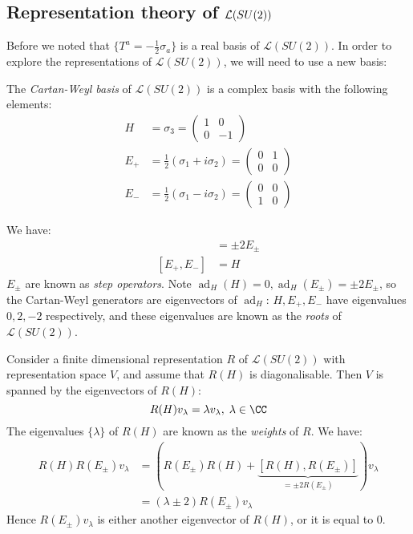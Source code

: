 \documentclass{jknotes}
\begin{document}
\subsection{Representation theory of \texorpdfstring{${\cal L}(SU(2))$}{L(SU(2))}}
Before we noted that \(\{T^a = -\frac{1}{2}\sigma_a\}\) is a real basis of \(\mathcal{L}(SU(2))\). In order to explore the representations of \(\mathcal{L}(SU(2))\), we will need to use a new basis:
\begin{defn}
    The \emph{Cartan-Weyl basis} of \(\mathcal{L}(SU(2))\) is a complex basis with the following elements:
    \begin{align}
        H &= \sigma_3 =
        \begin{pmatrix}
            1 & 0 \\
            0 & -1
        \end{pmatrix} \\
        E_+ &= \frac{1}{2}(\sigma_1 + i\sigma_2) = 
        \begin{pmatrix}
            0 & 1 \\
            0 & 0
        \end{pmatrix} \\
        E_- &= \frac{1}{2}(\sigma_1 - i\sigma_2) = 
        \begin{pmatrix}
            0 & 0 \\
            1 & 0
        \end{pmatrix}
    \end{align}
\end{defn}
We have:
\begin{align}
    [H,E_\pm] &= \pm2E_\pm \\
    [E_+,E_-] &= H
\end{align}
\(E_\pm\) are known as \emph{step operators}. Note \(\operatorname{ad}_H(H) = 0, \operatorname{ad}_H(E_\pm) = \pm2E_\pm\), so the Cartan-Weyl generators are eigenvectors of \(\operatorname{ad}_H\): \(H,E_+,E_-\) have eigenvalues \(0,2,-2\) respectively, and these eigenvalues are known as the \emph{roots} of \(\mathcal{L}(SU(2))\).

Consider a finite dimensional representation \(R\) of \(\mathcal{L}(SU(2))\) with representation space \(V\), and assume that \(R(H)\) is diagonalisable. Then \(V\) is spanned by the eigenvectors of \(R(H)\): 
\begin{equation}
    R(H)v_\lambda = \lambda v_\lambda, \; \lambda\in \CC
\end{equation}
The eigenvalues \(\{\lambda\}\) of \(R(H)\) are known as the \emph{weights} of \(R\). We have:
\begin{align}
    R(H)R(E_\pm)v_\lambda &= (R(E_\pm)R(H) + \underbrace{[R(H),R(E_\pm)]}_{=\pm 2R(E_\pm)})v_\lambda\\
    &= (\lambda\pm2)R(E_\pm)v_\lambda
\end{align}
Hence \(R(E_\pm)v_\lambda\) is either another eigenvector of \(R(H)\), or it is equal to \(0\).
\end{document}
